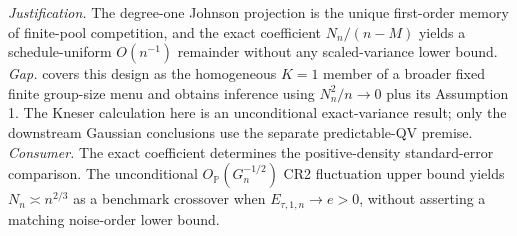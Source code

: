 \documentclass{article}
\begin{document}
\par\smallskip\noindent \textit{Justification.} The degree-one Johnson projection is the unique first-order memory of finite-pool competition, and the exact coefficient \(N_n/(n-M)\) yields a schedule-uniform \(O(n^{-1})\) remainder without any scaled-variance lower bound. \textit{Gap.} \cite{FuSamiiWang2026} covers this design as the homogeneous \(K=1\) member of a broader fixed finite group-size menu and obtains inference using \(N_n^2/n\to0\) plus its Assumption 1. The Kneser calculation here is an unconditional exact-variance result; only the downstream Gaussian conclusions use the separate predictable-QV premise. \textit{Consumer.} The exact coefficient determines the positive-density standard-error comparison. The unconditional \(O_{\mathbb P}(G_n^{-1/2})\) CR2 fluctuation upper bound yields \(N_n\asymp n^{2/3}\) as a benchmark crossover when \(E_{\tau,1,n}\to e>0\), without asserting a matching noise-order lower bound.
\end{document}
